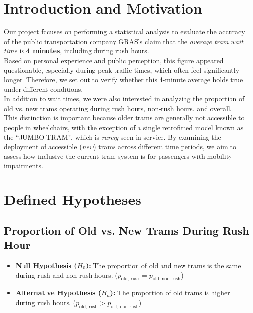 \documentclass[a4paper, 10pt]{article}
\begin{document}
	\tableofcontents
	\pagebreak
	
	\section{Introduction and Motivation}
		Our project focuses on performing a statistical analysis to evaluate the accuracy of the public transportation company GRAS's claim that the 
		\emph{average tram wait time} is \textbf{4 minutes}, including during rush hours. \\

		\noindent Based on personal experience and public perception, this figure appeared questionable, especially during peak traffic times, 
		which often feel significantly longer. Therefore, we set out to verify whether this 4-minute average holds true under different conditions. \\

		\noindent In addition to wait times, we were also interested in analyzing the proportion of old vs. new trams operating during rush hours, 
		non-rush hours, and overall. \\
		
		\noindent This distinction is important because older trams are generally not accessible 
		to people in wheelchairs, with the exception of a single retrofitted model known as the “JUMBO TRAM”, 
		which is \emph{rarely} seen in service. By examining the deployment of accessible (\emph{new}) trams across different time periods, we aim to assess how inclusive the current tram system is for passengers with mobility impairments.

	\section{Defined Hypotheses}
		\subsection{Proportion of Old vs. New Trams During Rush Hour}
			\begin{itemize}
					\item \textbf{Null Hypothesis ($H_0$):} The proportion of old and new trams is the same during rush and non-rush hours. ($p_{\text{old, rush}} = p_{\text{old, non-rush}}$)
					\item \textbf{Alternative Hypothesis ($H_a$):} The proportion of old trams is higher during rush hours. ($p_{\text{old, rush}} > p_{\text{old, non-rush}}$)
			\end{itemize}
\end{document}

